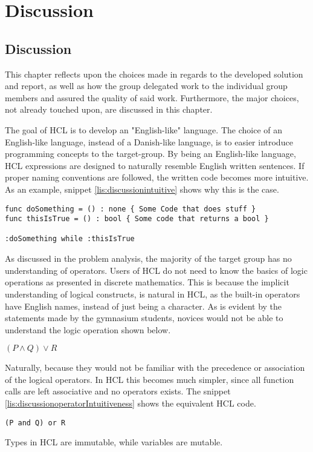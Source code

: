 \chapter{Discussion}
\section{Discussion}
This chapter reflects upon the choices made in regards to the developed solution and report, as well as how the group delegated work to the individual group members and assured the quality of said work.
Furthermore, the major choices, not already touched upon, are discussed in this chapter.

The goal of HCL is to develop an "English-like" language.
The choice of an English-like language, instead of a Danish-like language, is to easier introduce programming concepts to the target-group.
By being an English-like language, HCL expressions are designed to naturally resemble English written sentences.
If proper naming conventions are followed, the written code becomes more intuitive.
As an example, snippet \ref{lis:discussionintuitive} shows why this is the case.

\begin{lstlisting}[language=HCL,label=lis:discussionintuitive,firstnumber=1,caption=Example of the intuitive nature of HCL]
func doSomething = () : none { Some Code that does stuff }
func thisIsTrue = () : bool { Some code that returns a bool }

:doSomething while :thisIsTrue
\end{lstlisting}

As discussed in the problem analysis, the majority of the target group has no understanding of operators.
Users of HCL do not need to know the basics of logic operations as presented in discrete mathematics.
This is because the implicit understanding of logical constructs, is natural in HCL, as the built-in operators have English names, instead of just being a character.
As is evident by the statements made by the gymnasium students, novices would not be able to understand the logic operation shown below.
\begin{center}
	$(P \wedge Q) \vee R$
\end{center}
Naturally, because they would not be familiar with the precedence or association of the logical operators.
In HCL this becomes much simpler, since all function calls are left associative and no operators exists.
The snippet \ref{lis:discussionoperatorIntuitiveness} shows the equivalent HCL code.
\begin{lstlisting}[language=HCL,label=lis:discussionoperatorIntuitiveness,firstnumber=1,caption=Example of the intuitive nature of HCL]
(P and Q) or R
\end{lstlisting}
Types in HCL are immutable, while variables are mutable.

